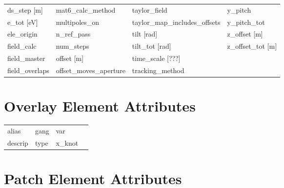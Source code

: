 \begin{tabular}{llll}
ds_step [m]                    & mat6_calc_method               & taylor_field                   & y_pitch                        \\
e_tot [eV]                     & multipoles_on                  & taylor_map_includes_offsets    & y_pitch_tot                    \\
ele_origin                     & n_ref_pass                     & tilt [rad]                     & z_offset [m]                   \\
field_calc                     & num_steps                      & tilt_tot [rad]                 & z_offset_tot [m]               \\
field_master                   & offset [m]                     & time_scale [???]               &                                \\
field_overlaps                 & offset_moves_aperture          & tracking_method                &                                \\
 \bottomrule
 \end{tabular}
 \vfill
 
 \section{Overlay Element Attributes}
 \label{s:list.overlay}
 
 \begin{tabular}{llll} \toprule
alias                          & gang                           & var                            &                                \\
descrip                        & type                           & x_knot                         &                                \\
 \bottomrule
 \end{tabular}
 \vfill
 
 \section{Patch Element Attributes}
 \label{s:list.patch}
 
